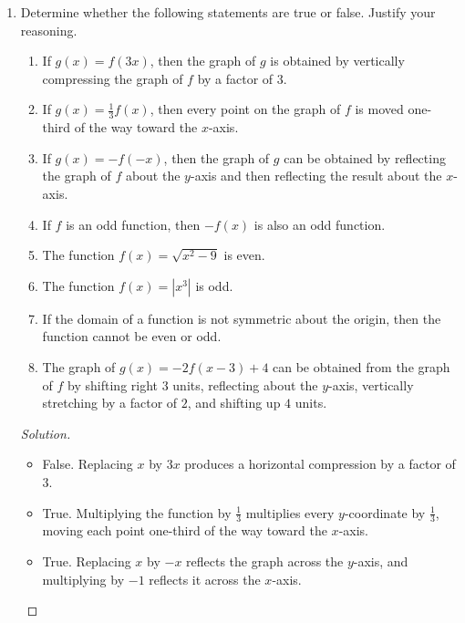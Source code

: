 \documentclass[12pt]{article}
\newenvironment{solution}{\begin{proof}[Solution]}{\end{proof}}
\begin{document}
\begin{enumerate}
		\item Determine whether the following statements are true or false. Justify your reasoning.
		\begin{enumerate}
			
			\item If $g(x)=f(3x)$, then the graph of $g$ is obtained by vertically compressing the graph of $f$ by a factor of $3$.
			
			\item If $g(x)=\frac{1}{3}f(x)$, then every point on the graph of $f$ is moved one-third of the way toward the $x$-axis.
			
			\item If $g(x)=-f(-x)$, then the graph of $g$ can be obtained by reflecting the graph of $f$ about the $y$-axis and then reflecting the result about the $x$-axis.
			
			\item If $f$ is an odd function, then $-f(x)$ is also an odd function.
			
			\item The function
			$
			f(x)=\sqrt{x^2-9}
			$
			is even.
			
			\item The function
			$
			f(x)=|x^3|
			$
			is odd.
			\item If the domain of a function is not symmetric about the origin, then the function cannot be even or odd.
			
			\item The graph of
			$
			g(x)=-2f(x-3)+4
			$
			can be obtained from the graph of $f$ by shifting right $3$ units, reflecting about the $y$-axis, vertically stretching by a factor of $2$, and shifting up $4$ units.
			
		\end{enumerate}
		\begin{solution}
			\begin{itemize}
				\item[(a)] False. Replacing $x$ by $3x$ produces a horizontal compression by a factor of $3$.
					
				\item[(b)] True.	Multiplying the function by $\frac{1}{3}$ multiplies every $y$-coordinate by $\frac{1}{3}$, moving each point one-third of the way toward the $x$-axis.
					
				\item[(c)] True. Replacing $x$ by $-x$ reflects the graph across the $y$-axis, and multiplying by $-1$ reflects it across the $x$-axis.
					

\end{itemize}
\end{solution}
\end{enumerate}
\end{document}
